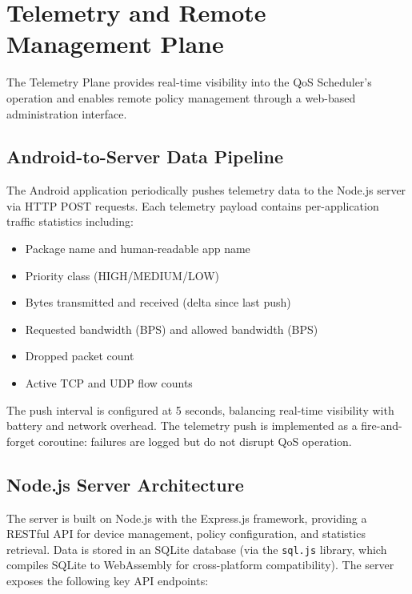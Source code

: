 \section{Telemetry and Remote Management Plane}
\label{sec:telemetry_plane}

The Telemetry Plane provides real-time visibility into the QoS Scheduler's operation and enables remote policy management through a web-based administration interface.

\subsection{Android-to-Server Data Pipeline}

The Android application periodically pushes telemetry data to the Node.js server via HTTP POST requests. Each telemetry payload contains per-application traffic statistics including:

\begin{itemize}[noitemsep]
    \item Package name and human-readable app name
    \item Priority class (HIGH/MEDIUM/LOW)
    \item Bytes transmitted and received (delta since last push)
    \item Requested bandwidth (BPS) and allowed bandwidth (BPS)
    \item Dropped packet count
    \item Active TCP and UDP flow counts
\end{itemize}

The push interval is configured at 5 seconds, balancing real-time visibility with battery and network overhead. The telemetry push is implemented as a fire-and-forget coroutine: failures are logged but do not disrupt QoS operation.

\subsection{Node.js Server Architecture}

The server is built on Node.js with the Express.js framework, providing a RESTful API for device management, policy configuration, and statistics retrieval. Data is stored in an SQLite database (via the \texttt{sql.js} library, which compiles SQLite to WebAssembly for cross-platform compatibility). The server exposes the following key API endpoints:

